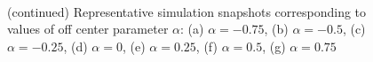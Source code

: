 \documentclass[../../master_thesis_np.tex]{subfiles}
\begin{document}
\begin{figure}[hbtp]
			\\
			\caption{}
		\end{figure}
		\begin{figure}[htp]
			\centering
			\ContinuedFloat
			
			\caption{(continued) Representative simulation snapshots corresponding to values of off center parameter $\alpha$: (a) $\alpha = -0.75$, (b) $\alpha = -0.5$, (c) $\alpha = -0.25$, (d) $\alpha = 0$, (e) $\alpha = 0.25$, (f) $\alpha = 0.5$, (g) $\alpha = 0.75$}
			\label{fig:lj_oc_situa}
		\end{figure}
		
\end{document}
